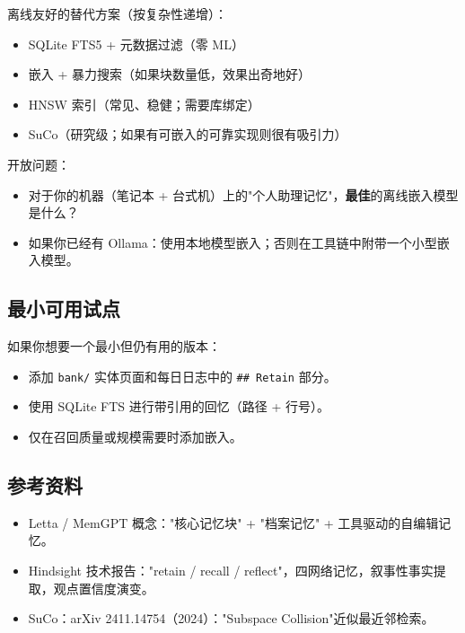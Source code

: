 离线友好的替代方案（按复杂性递增）：

\begin{itemize}
  \item SQLite FTS5 + 元数据过滤（零 ML）
  \item 嵌入 + 暴力搜索（如果块数量低，效果出奇地好）
  \item HNSW 索引（常见、稳健；需要库绑定）
  \item SuCo（研究级；如果有可嵌入的可靠实现则很有吸引力）
\end{itemize}


开放问题：

\begin{itemize}
  \item 对于你的机器（笔记本 + 台式机）上的"个人助理记忆"，\textbf{最佳}的离线嵌入模型是什么？
  \item 如果你已经有 Ollama：使用本地模型嵌入；否则在工具链中附带一个小型嵌入模型。
\end{itemize}


\subsection{最小可用试点}


如果你想要一个最小但仍有用的版本：

\begin{itemize}
  \item 添加 \texttt{bank/} 实体页面和每日日志中的 \texttt{\#\# Retain} 部分。
  \item 使用 SQLite FTS 进行带引用的回忆（路径 + 行号）。
  \item 仅在召回质量或规模需要时添加嵌入。
\end{itemize}


\subsection{参考资料}


\begin{itemize}
  \item Letta / MemGPT 概念："核心记忆块" + "档案记忆" + 工具驱动的自编辑记忆。
  \item Hindsight 技术报告："retain / recall / reflect"，四网络记忆，叙事性事实提取，观点置信度演变。
  \item SuCo：arXiv 2411.14754（2024）："Subspace Collision"近似最近邻检索。
\end{itemize}



